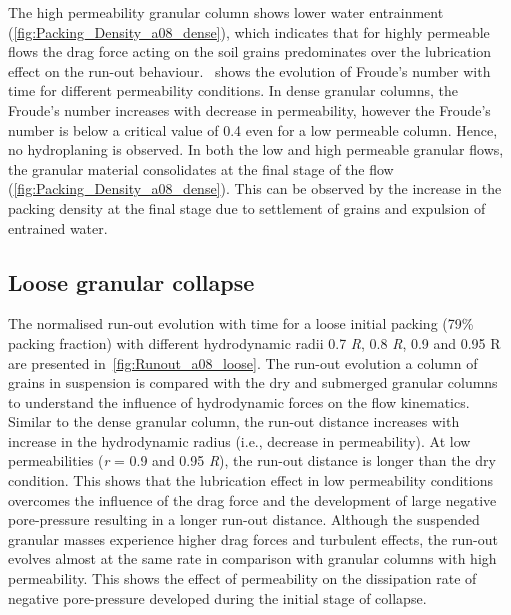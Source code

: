 \documentclass[12pt,a4paper,twocolumn,fleqn]{narms}
\begin{document}
The high permeability granular column shows lower water entrainment 
(\cref{fig:Packing_Density_a08_dense}), which indicates that for highly 
permeable flows the drag force acting on the soil grains predominates over the 
lubrication effect on the run-out behaviour.~ shows the 
evolution of Froude's number with time for different permeability conditions. 
In dense granular columns, the Froude's number increases with decrease in 
permeability, however the Froude's number is below a critical value of 0.4 even 
for a low permeable column. Hence, no hydroplaning is observed. In both the low 
and high permeable granular flows, the granular material consolidates at the 
final stage of the flow (\cref{fig:Packing_Density_a08_dense}). This can be 
observed by the increase in the packing density at the final stage due to 
settlement of grains and expulsion of entrained water.

\subsection{Loose granular collapse}

The normalised run-out evolution with time for a loose initial packing (79\% 
packing fraction) with different hydrodynamic radii 0.7 \textit{R}, 0.8 
\textit{R}, 0.9 and 0.95 R are presented in~\cref{fig:Runout_a08_loose}. The 
run-out evolution a column of grains in suspension is compared with the dry and 
submerged granular columns to understand the influence of hydrodynamic forces 
on the flow kinematics. Similar to the dense granular column, the run-out 
distance increases with increase in the hydrodynamic radius (i.e., decrease in 
permeability). At low permeabilities (\textit{r} = 0.9 and 0.95 \textit{R}), 
the run-out distance is longer than the dry condition. This shows that the 
lubrication effect in low permeability conditions overcomes the influence of 
the drag force and the development of large negative pore-pressure resulting in 
a longer run-out distance. Although the suspended granular masses experience 
higher drag forces and turbulent effects, the run-out evolves almost at the 
same rate in comparison with granular columns with high permeability. This 
shows the effect of permeability on the dissipation rate of negative 
pore-pressure developed during the initial stage of collapse.
\end{document}
